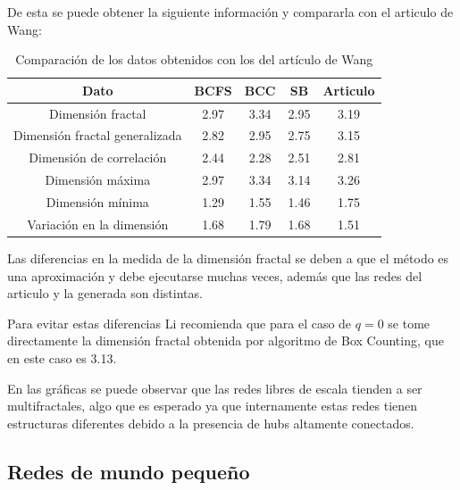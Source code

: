 De esta se puede obtener la siguiente información y compararla con el articulo de Wang\cite{Wang2012}:

\begin{table}[H]
    \centering
    \begin{tabular}{|c|c|c|c|c|}
        \hline
         \textbf{Dato}& \textbf{BCFS} & \textbf{BCC} & \textbf{SB} & \textbf{Articulo} \\
         \hline
         Dimensión fractal & 2.97 & 3.34 & 2.95 & 3.19 \\
         \hline
         Dimensión fractal generalizada & 2.82 & 2.95 & 2.75 &3.15  \\
         \hline
         Dimensión de correlación & 2.44 & 2.28 & 2.51 &2.81 \\
         \hline
         Dimensión máxima & 2.97 & 3.34 & 3.14 &3.26 \\
         \hline
         Dimensión mínima & 1.29 & 1.55 & 1.46 &1.75 \\
         \hline
         Variación en la dimensión & 1.68 & 1.79 & 1.68 &1.51 \\
         \hline
    \end{tabular}
    \caption{Comparación de los datos obtenidos con los del artículo de Wang\cite{Wang2012}}
\end{table}

Las diferencias en la medida de la dimensión fractal se deben a que el método es una aproximación y debe ejecutarse muchas veces, además que las redes del articulo y la generada son distintas.

Para evitar estas diferencias Li\cite{Li2014} recomienda que para el caso de $q=0$ se tome directamente la dimensión fractal obtenida por algoritmo de Box Counting, que en este caso es 3.13.

En las gráficas se puede observar que las redes libres de escala tienden a ser multifractales, algo que es esperado ya que internamente estas redes tienen estructuras diferentes debido a la presencia de hubs altamente conectados.

\subsection{Redes de mundo pequeño}

